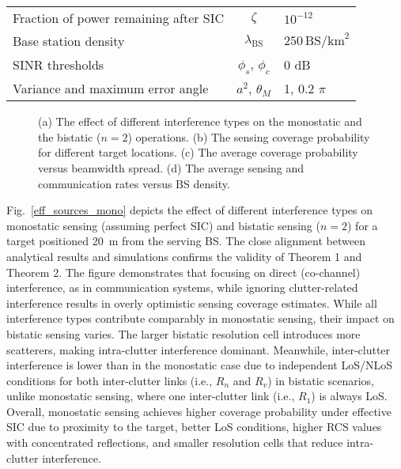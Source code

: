 \documentclass[journal]{IEEEtran}
\begin{document}
\begin{table}
\begin{center}
\begin{tabular}{l@{}cl}
Fraction of power remaining after SIC  & $\zeta$                 & $10^{-12}$                      \\ 
 Base station density            & $\lambda_{\text{BS}}$   & $250 \, \text{BS/km}^2$       \\ 
SINR thresholds            &   $\phi_s$,  $\phi_c$                       &     0 dB                           \\
Variance and maximum  error angle &  $a^2$, $\theta_M$  & 1, 0.2 $\pi$    \cite{bahadori2019device} \\ 
 \end{tabular}
\label{tab:system_parameters}
  \end{center}
\end{table}


\begin{figure*}
\centering
\subfloat[\label{eff_sources_mono}]{%
  
}%
\subfloat[ \label{dist_effect}]{%
   
}%
   \subfloat[  \label{beam_tradeoff}]{%
   
   }
   \hspace{-0.66cm}
     \subfloat[  \label{bs_avg_tot}]{%
   
}%
\caption{ (a) The effect of different interference types on the monostatic and the bistatic ($n=2$) operations. (b) The sensing coverage probability for different target locations. (c) The average coverage probability versus beamwidth spread. (d) The average sensing and communication rates versus BS density. }
\end{figure*}





Fig.~\ref{eff_sources_mono} depicts the effect of different interference types on monostatic sensing (assuming perfect SIC) and bistatic sensing ($n=2$) for a target positioned 20~m from the serving BS. The close alignment between analytical results and simulations confirms the validity of Theorem 1 and Theorem 2.
 The figure demonstrates that focusing on direct (co-channel) interference, as in communication systems, while ignoring clutter-related interference results in overly optimistic sensing coverage estimates. While all interference types contribute comparably in monostatic sensing, their impact on bistatic sensing varies.
The larger bistatic resolution cell introduces more scatterers, making intra-clutter interference dominant. Meanwhile, inter-clutter interference is lower than in the monostatic case due to independent LoS/NLoS conditions for both inter-clutter links (i.e., $R_n$ and $R_v$) in bistatic scenarios, unlike monostatic sensing, where one inter-clutter link (i.e., $R_1$) is always LoS.
 Overall, monostatic sensing achieves higher coverage probability under effective SIC due to proximity to the target, better LoS conditions, higher RCS values with concentrated reflections, and smaller resolution cells that reduce intra-clutter interference.
\end{document}

